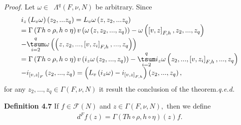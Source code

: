\documentclass[11pt]{article}
\begin{document}
\emph{Proof.} Let $\omega \in $\emph{\ }$\Lambda ^{q}\left( F,\nu ,N\right) $
be arbitrary. Since
\begin{equation*}
\begin{array}{l}
i_{z}\left( L_{v}\omega \right) \left( z_{2},...z_{q}\right) =L_{v}\omega
\left( z,z_{2},...z_{q}\right) \\
=\Gamma \left( Th\circ \rho ,h\circ \eta \right) v\left( \omega \left(
z,z_{2},...,z_{q}\right) \right) -\omega \left( \left[ v,z\right]
_{F,h},z_{2},...,z_{q}\right) \\
-\overset{q}{\underset{i=2}{\tsum }}\omega \left( \left( z,z_{2},...,\left[
v,z_{i}\right] _{F,h},...,z_{q}\right) \right) \\
=\Gamma \left( Th\circ \rho ,h\circ \eta \right) v\left( i_{z}\omega \left(
z_{2},...,z_{q}\right) \right) -\overset{q}{\underset{i=2}{\tsum }}%
i_{z}\omega \left( z_{2},...,\left[ v,z_{i}\right] _{F,h},...,z_{q}\right)
\\
-i_{\left[ v,z\right] _{F}}\left( z_{2},...,z_{q}\right) =\left( L_{v}\left(
i_{z}\omega \right) -i_{\left[ v,z\right] _{F,h}}\right) \left(
z_{2},...,z_{q}\right) ,%
\end{array}%
\end{equation*}%
for any $z_{2},...,z_{q}\in \Gamma \left( F,\nu ,N\right) $ it result the
conclusion of the theorem.\hfill \emph{q.e.d.}

\textbf{Definition 4.7 }If $f\in \mathcal{F}\left( N\right) $ and $z\in
\Gamma \left( F,\nu ,N\right) ,$ then we define \textbf{\ }%
\begin{equation*}
\begin{array}{c}
d^{F}f\left( z\right) =\Gamma \left( Th\circ \rho ,h\circ \eta \right)
\left( z\right) f.%
\end{array}%
\end{equation*}
\end{document}
